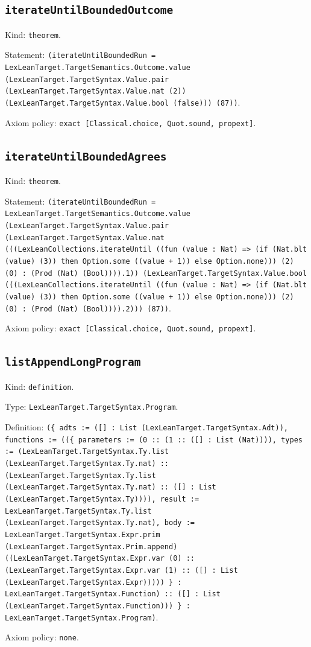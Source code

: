 \documentclass[11pt]{article}
\begin{document}
\subsection*{\texttt{iterateUntilBoundedOutcome}}
\noindent Kind: \texttt{theorem}.\par
\noindent Statement: \texttt{(iterateUntilBoundedRun = LexLeanTarget.TargetSemantics.Outcome.value (LexLeanTarget.TargetSyntax.Value.pair (LexLeanTarget.TargetSyntax.Value.nat (2)) (LexLeanTarget.TargetSyntax.Value.bool (false))) (87))}.\par
\noindent Axiom policy: \texttt{exact [Classical.choice, Quot.sound, propext]}.\par
\subsection*{\texttt{iterateUntilBoundedAgrees}}
\noindent Kind: \texttt{theorem}.\par
\noindent Statement: \texttt{(iterateUntilBoundedRun = LexLeanTarget.TargetSemantics.Outcome.value (LexLeanTarget.TargetSyntax.Value.pair (LexLeanTarget.TargetSyntax.Value.nat (((LexLeanCollections.iterateUntil ((fun (value : Nat) => (if (Nat.blt (value) (3)) then Option.some ((value + 1)) else Option.none))) (2) (0) : (Prod (Nat) (Bool)))).1)) (LexLeanTarget.TargetSyntax.Value.bool (((LexLeanCollections.iterateUntil ((fun (value : Nat) => (if (Nat.blt (value) (3)) then Option.some ((value + 1)) else Option.none))) (2) (0) : (Prod (Nat) (Bool)))).2))) (87))}.\par
\noindent Axiom policy: \texttt{exact [Classical.choice, Quot.sound, propext]}.\par
\subsection*{\texttt{listAppendLongProgram}}
\noindent Kind: \texttt{definition}.\par
\noindent Type: \texttt{LexLeanTarget.TargetSyntax.Program}.\par
\noindent Definition: \texttt{(\{ adts := ([] : List (LexLeanTarget.TargetSyntax.Adt)), functions := ((\{ parameters := (0 :: (1 :: ([] : List (Nat)))), types := (LexLeanTarget.TargetSyntax.Ty.list (LexLeanTarget.TargetSyntax.Ty.nat) :: (LexLeanTarget.TargetSyntax.Ty.list (LexLeanTarget.TargetSyntax.Ty.nat) :: ([] : List (LexLeanTarget.TargetSyntax.Ty)))), result := LexLeanTarget.TargetSyntax.Ty.list (LexLeanTarget.TargetSyntax.Ty.nat), body := LexLeanTarget.TargetSyntax.Expr.prim (LexLeanTarget.TargetSyntax.Prim.append) ((LexLeanTarget.TargetSyntax.Expr.var (0) :: (LexLeanTarget.TargetSyntax.Expr.var (1) :: ([] : List (LexLeanTarget.TargetSyntax.Expr))))) \} : LexLeanTarget.TargetSyntax.Function) :: ([] : List (LexLeanTarget.TargetSyntax.Function))) \} : LexLeanTarget.TargetSyntax.Program)}.\par
\noindent Axiom policy: \texttt{none}.\par
\end{document}
